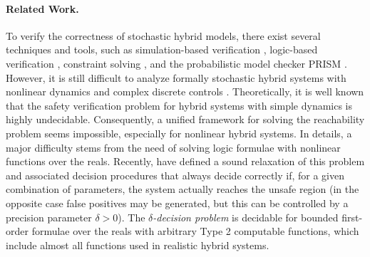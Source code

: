 \paragraph{Related Work.}To verify the correctness of stochastic hybrid models, there exist several techniques and tools, such as simulation-based verification \cite{zuliani2010bayesian, abate2007probabilistic}, logic-based verification \cite{platzer2011stochastic}, constraint solving \cite{franzle2008stochastic}, and the probabilistic model checker PRISM \cite{website:prism}. However, it is still difficult to analyze formally stochastic hybrid systems with nonlinear dynamics and complex discrete controls \cite{alur2011formal, henzinger2000theory}. Theoretically, it is well known that the safety verification problem for hybrid systems with simple dynamics is highly undecidable. Consequently, a unified framework for solving the reachability problem seems impossible, especially for nonlinear hybrid systems. In details, a major difficulty stems from the need of solving logic formulae with nonlinear functions over the reals. Recently, \cite{gao2013dreal, gao2013satisfiability} 
have defined a sound relaxation of this problem and associated decision procedures that always decide correctly 
if, for a given combination of parameters, the system actually reaches the unsafe region (in the opposite case
false positives may be generated, but this can be controlled by a precision parameter $\delta>0$).
The $\delta${\em -decision problem} is decidable for bounded first-order formulae over the reals with arbitrary 
Type 2 computable functions, which include almost all functions used in realistic hybrid systems.   
